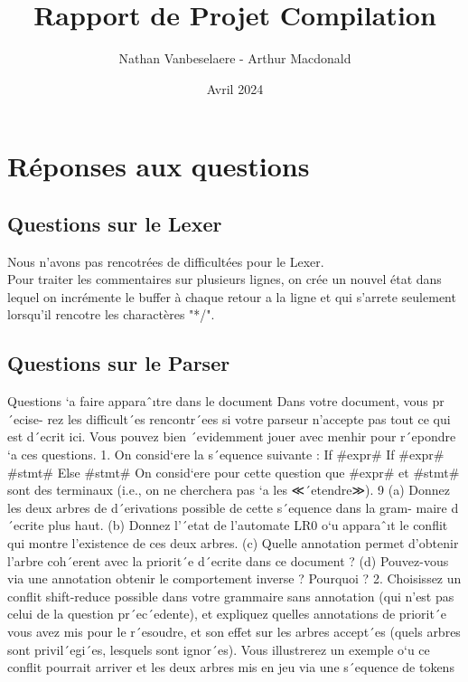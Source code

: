 \documentclass{report}
\title{\textbf{\Huge Rapport de Projet Compilation }}
\author{Nathan Vanbeselaere - Arthur Macdonald}
\date{Avril 2024}
\begin{document}
\maketitle
\newpage

\tableofcontents
\newpage

\chapter*{Réponses aux questions}
    \section*{Questions sur le Lexer}

        Nous n'avons pas rencotrées de difficultées pour le Lexer.\\
        Pour traiter les commentaires sur plusieurs lignes, on crée un nouvel état dans lequel on incrémente le buffer à chaque retour a la ligne et qui s'arrete seulement lorsqu'il rencotre les charactères "*/". 

    \section*{Questions sur le Parser}

    Questions `a faire apparaˆıtre dans le document Dans votre document, vous pr´ecise-
    rez les difficult´es rencontr´ees si votre parseur n’accepte pas tout ce qui est d´ecrit ici.
    Vous pouvez bien ´evidemment jouer avec menhir pour r´epondre `a ces questions.
    1. On consid`ere la s´equence suivante : If #expr# If #expr# #stmt# Else #stmt#
    On consid`ere pour cette question que #expr# et #stmt# sont des terminaux (i.e., on
    ne cherchera pas `a les ≪´etendre≫).
    9
    (a) Donnez les deux arbres de d´erivations possible de cette s´equence dans la gram-
    maire d´ecrite plus haut.
    (b) Donnez l’´etat de l’automate LR0 o`u apparaˆıt le conflit qui montre l’existence
    de ces deux arbres.
    (c) Quelle annotation permet d’obtenir l’arbre coh´erent avec la priorit´e d´ecrite dans
    ce document ?
    (d) Pouvez-vous via une annotation obtenir le comportement inverse ? Pourquoi ?
    2. Choisissez un conflit shift-reduce possible dans votre grammaire sans annotation (qui
    n’est pas celui de la question pr´ec´edente), et expliquez quelles annotations de priorit´e
    vous avez mis pour le r´esoudre, et son effet sur les arbres accept´es (quels arbres sont
    privil´egi´es, lesquels sont ignor´es). Vous illustrerez un exemple o`u ce conflit pourrait
    arriver et les deux arbres mis en jeu via une s´equence de tokens
\end{document}

